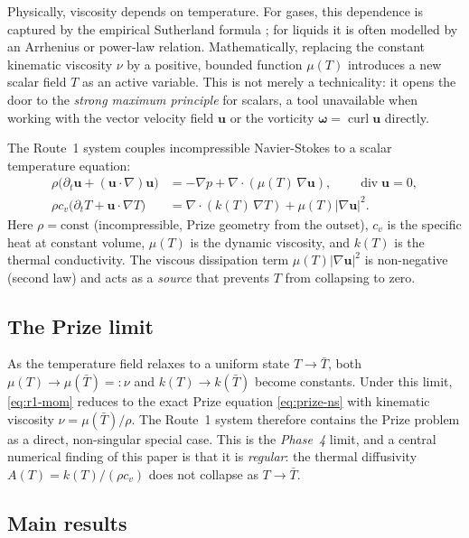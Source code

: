 \documentclass[12pt]{article}
\newcommand{\abs}[1]{\left|#1\right|}
\newcommand{\Div}{\operatorname{div}}
\newcommand{\curl}{\operatorname{curl}}
\newcommand{\p}{\partial}
\newcommand{\grad}{\nabla}
\begin{document}
Physically, viscosity depends on temperature.  For gases, this dependence is
captured by the empirical Sutherland formula \citep{Sutherland1893}; for liquids
it is often modelled by an Arrhenius or power-law relation.  Mathematically,
replacing the constant kinematic viscosity $\nu$ by a positive, bounded function
$\mu(T)$ introduces a new scalar field $T$ as an active variable.  This is not
merely a technicality: it opens the door to the \emph{strong maximum principle}
for scalars, a tool unavailable when working with the vector velocity field $\mathbf{u}$
or the vorticity $\boldsymbol{\omega} = \curl\mathbf{u}$ directly.

The Route~1 system couples incompressible Navier-Stokes to a scalar temperature
equation:
\begin{align}
  \label{eq:r1-mom}
  \rho\bigl(\p_t\mathbf{u} + (\mathbf{u}\cdot\grad)\mathbf{u}\bigr)
    &= -\grad p + \grad\cdot(\mu(T)\,\grad\mathbf{u}),
    \qquad \Div\mathbf{u} = 0,\\
  \label{eq:r1-temp}
  \rho c_v\bigl(\p_t T + \mathbf{u}\cdot\grad T\bigr)
    &= \grad\cdot(k(T)\,\grad T) + \mu(T)\abs{\grad\mathbf{u}}^2.
\end{align}
Here $\rho = \mathrm{const}$ (incompressible, Prize geometry from the outset),
$c_v$ is the specific heat at constant volume, $\mu(T)$ is the dynamic viscosity,
and $k(T)$ is the thermal conductivity.  The viscous dissipation term $\mu(T)\abs{\grad\mathbf{u}}^2$
is non-negative (second law) and acts as a \emph{source} that prevents $T$ from
collapsing to zero.

\subsection{The Prize limit}
\label{ssec:prize-limit}

As the temperature field relaxes to a uniform state $T\to\bar{T}$, both $\mu(T)\to
\mu(\bar{T}) =: \nu$ and $k(T)\to k(\bar{T})$ become constants.  Under this limit,
\eqref{eq:r1-mom} reduces to the exact Prize equation \eqref{eq:prize-ns} with
kinematic viscosity $\nu = \mu(\bar{T})/\rho$.  The Route~1 system therefore
contains the Prize problem as a direct, non-singular special case.  This is the
\emph{Phase~4} limit, and a central numerical finding of this paper is that it is
\emph{regular}: the thermal diffusivity $A(T) = k(T)/(\rho c_v)$ does not collapse
as $T\to\bar{T}$.

\subsection{Main results}
\label{ssec:main-results}
\end{document}
